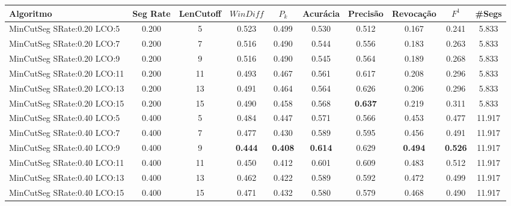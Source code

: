 \documentclass{article}
\begin{document}
 

\begin{longtable}[c]{|l|c|c|c|c|c|c|c|c|c|} 
\hline 
Algoritmo & Seg Rate & LenCutoff & $WinDiff$ & $P_k$ & Acurácia & Precisão & Revocação & $F^1$ & \#Segs\\ \hline 
MinCutSeg SRate:0.20 LCO:5 & 0.200 & 5 & 0.523 & 0.499 & 0.530 & 0.512 & 0.167 & 0.241 & 5.833  \\ \hline 
 MinCutSeg SRate:0.20 LCO:7 & 0.200 & 7 & 0.516 & 0.490 & 0.544 & 0.556 & 0.183 & 0.263 & 5.833  \\ \hline 
 MinCutSeg SRate:0.20 LCO:9 & 0.200 & 9 & 0.516 & 0.490 & 0.545 & 0.564 & 0.189 & 0.268 & 5.833  \\ \hline 
 MinCutSeg SRate:0.20 LCO:11 & 0.200 & 11 & 0.493 & 0.467 & 0.561 & 0.617 & 0.208 & 0.296 & 5.833  \\ \hline 
 MinCutSeg SRate:0.20 LCO:13 & 0.200 & 13 & 0.491 & 0.464 & 0.564 & 0.626 & 0.206 & 0.296 & 5.833  \\ \hline 
 MinCutSeg SRate:0.20 LCO:15 & 0.200 & 15 & 0.490 & 0.458 & 0.568 & \cellcolor{gray!20} \textbf{0.637} & 0.219 & 0.311 & 5.833  \\ \hline 
 MinCutSeg SRate:0.40 LCO:5 & 0.400 & 5 & 0.484 & 0.447 & 0.571 & 0.566 & 0.453 & 0.477 & 11.917  \\ \hline 
 MinCutSeg SRate:0.40 LCO:7 & 0.400 & 7 & 0.477 & 0.430 & 0.589 & 0.595 & 0.456 & 0.491 & 11.917  \\ \hline 
 MinCutSeg SRate:0.40 LCO:9 & 0.400 & 9 & \cellcolor{gray!20} \textbf{0.444} & \cellcolor{gray!20} \textbf{0.408} & \cellcolor{gray!20} \textbf{0.614} & 0.629 & \cellcolor{gray!20} \textbf{0.494} & \cellcolor{gray!20} \textbf{0.526} & 11.917  \\ \hline 
 MinCutSeg SRate:0.40 LCO:11 & 0.400 & 11 & 0.450 & 0.412 & 0.601 & 0.609 & 0.483 & 0.512 & 11.917  \\ \hline 
 MinCutSeg SRate:0.40 LCO:13 & 0.400 & 13 & 0.462 & 0.422 & 0.589 & 0.592 & 0.472 & 0.499 & 11.917  \\ \hline 
 MinCutSeg SRate:0.40 LCO:15 & 0.400 & 15 & 0.471 & 0.432 & 0.580 & 0.579 & 0.468 & 0.490 & 11.917  \\ \hline 
 \end{longtable} 
\end{document}
